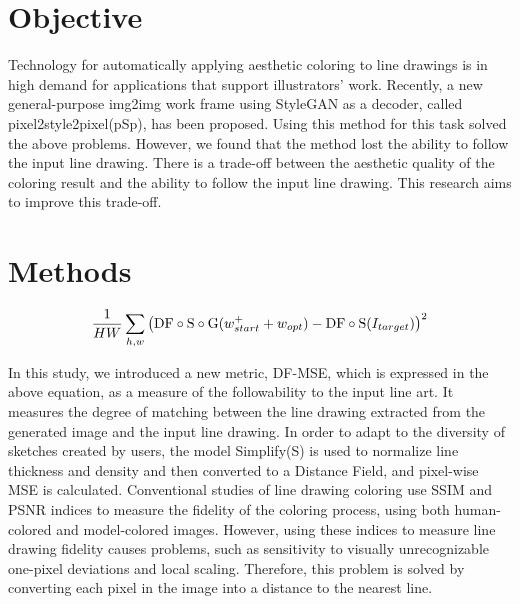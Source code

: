 \documentclass[a4paper]{article}
\newcommand{\aftersection}{\vspace{-5pt}}
\newcommand{\beforesection}{\vspace{-10pt}}
\begin{document}
\vspace{-20pt}
\begin{multicols}{2}
\section*{Objective}
\aftersection

Technology for automatically applying aesthetic coloring to line drawings is in high demand for applications that support illustrators' work. 
Recently, a new general-purpose img2img work frame using StyleGAN as a decoder, called pixel2style2pixel(pSp), has been proposed. Using this method for this task solved the above problems. However, we found that the method lost the ability to follow the input line drawing. There is a trade-off between the aesthetic quality of the coloring result and the ability to follow the input line drawing. This research aims to improve this trade-off.

\beforesection
\section*{Methods}
\aftersection
\vspace{-15pt}

\small
\begin{align*}
\frac{1}{HW}\sum_{h,w}\left({\rm DF \circ S\circ G}(w^+_{start}+w_{opt})-{\rm DF \circ S}(I_{target})\right)^2
\end{align*}
\normalsize

In this study, we introduced a new metric, DF-MSE, which is expressed in the above equation, as a measure of the followability to the input line art. It measures the degree of matching between the line drawing extracted from the generated image and the input line drawing. In order to adapt to the diversity of sketches created by users, the model Simplify(S) is used to normalize line thickness and density and then converted to a Distance Field, and pixel-wise MSE is calculated. Conventional studies of line drawing coloring use SSIM and PSNR indices to measure the fidelity of the coloring process, using both human-colored and model-colored images. However, using these indices to measure line drawing fidelity causes problems, such as sensitivity to visually unrecognizable one-pixel deviations and local scaling. Therefore, this problem is solved by converting each pixel in the image into a distance to the nearest line.


\end{multicols}
\end{document}
